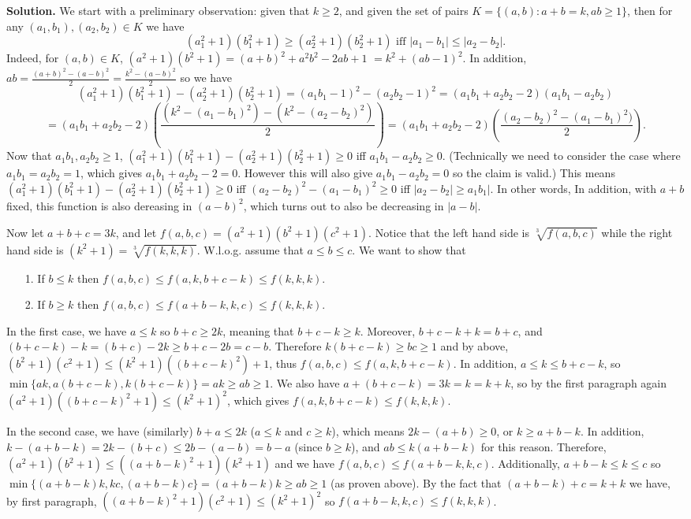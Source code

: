 \documentclass[11pt,a4paper]{article}
\begin{document}
\begin{itemize}
\textbf{Solution.} 
We start with a preliminary observation: 
given that $k\ge 2$, and given the set of pairs $K=\{(a,b): a+b=k, ab\ge 1\}$, 
then for any $(a_1,b_1), (a_2, b_2)\in K$ we have
\[(a_1^2+1)(b_1^2+1)\ge (a_2^2+1)(b_2^2+1) \text{ iff } |a_1-b_1|\le |a_2-b_2|.\] 
Indeed, for $(a,b)\in K$, $(a^2+1)(b^2+1)=(a+b)^2+a^2b^2-2ab+1$
$=k^2+(ab-1)^2$. 
In addition, $ab=\frac{(a+b)^2-(a-b)^2}{2}=\frac{k^2-(a-b)^2}{2}$
so we have 
\[(a_1^2+1)(b_1^2+1)-(a_2^2+1)(b_2^2+1)
=(a_1b_1-1)^2-(a_2b_2-1)^2
=(a_1b_1+a_2b_2-2)(a_1b_1-a_2b_2)\]
\[=(a_1b_1+a_2b_2-2)\left(\frac{(k^2-(a_1-b_1)^2)-(k^2-(a_2-b_2)^2)}{2}\right)
=(a_1b_1+a_2b_2-2)\left(\frac{(a_2-b_2)^2-(a_1-b_1)^2)}{2}\right).\]
Now that $a_1b_1, a_2b_2\ge 1$, 
$(a_1^2+1)(b_1^2+1)-(a_2^2+1)(b_2^2+1)\ge 0$ iff 
$a_1b_1-a_2b_2\ge 0$. 
(Technically we need to consider the case where $a_1b_1=a_2b_2=1$, which gives $a_1b_1+a_2b_2-2=0$. 
However this will also give $a_1b_1-a_2b_2=0$ so the claim is valid.)
This means $(a_1^2+1)(b_1^2+1)-(a_2^2+1)(b_2^2+1)\ge 0$ iff $(a_2-b_2)^2-(a_1-b_1)^2\ge 0$ 
iff $|a_2-b_2|\ge a_1b_1|$. 
In other words, 
In addition, with $a+b$ fixed, this function is also dereasing in $(a-b)^2$, which turns out to also be decreasing in $|a-b|$. 

Now let $a+b+c=3k$, and let $f(a,b,c)=(a^2+1)(b^2+1)(c^2+1)$. 
Notice that the left hand side is $\sqrt[3]{f(a,b,c)}$ while the right hand side is $(k^2+1)=\sqrt[3]{f(k,k,k)}$. 
W.l.o.g. assume that $a\le b\le c$. We want to show that 
\begin{itemize}
\item [1.] If $b\le k$ then $f(a,b,c)\le f(a, k, b+c-k)\le f(k, k, k)$. 
\item [2.] If $b\ge k$ then $f(a,b,c)\le f(a+b-k, k, c)\le f(k,k,k)$. 
\end{itemize}

In the first case, we have $a\le k$ so $b+c\ge 2k$, meaning that 
$b+c-k\ge k$. 
Moreover, $b+c-k+k=b+c$, and $(b+c-k)-k=(b+c)-2k\ge b+c-2b=c-b$. 
Therefore $k(b+c-k)\ge bc\ge 1$ and by above, $(b^2+1)(c^2+1)\le (k^2+1)((b+c-k)^2)+1$, thus 
$f(a,b,c)\le f(a, k, b+c-k)$. 
In addition, $a\le k\le b+c-k$, so $\min\{ak, a(b+c-k), k(b+c-k)\}=ak\ge ab\ge 1$. 
We also have $a+(b+c-k)=3k=k=k+k$, 
so by the first paragraph again 
$(a^2+1)((b+c-k)^2+1)\le (k^2+1)^2$, 
which gives 
$f(a, k, b+c-k)\le f(k, k, k)$. 

In the second case, we have (similarly)
$b+a\le 2k$ ($a\le k$ and $c\ge k$), which means $2k-(a+b)\ge 0$, or $k\ge a+b-k$. In addition, 
$k-(a+b-k)=2k-(b+c)\le 2b-(a-b)=b-a$ (since $b\ge k$), 
and 
$ab\le k(a+b-k)$ for this reason. 
Therefore, 
$(a^2+1)(b^2+1)\le ((a+b-k)^2+1)(k^2+1)$ 
and we have $f(a,b,c)\le f(a+b-k, k, c)$. 
Additionally, $a+b-k\le k\le c$ so
$\min\{(a+b-k)k, kc, (a+b-k)c\}=(a+b-k)k\ge ab\ge 1$ (as proven above). 
By the fact that $(a+b-k)+c=k+k$ we have, by first paragraph, 
$((a+b-k)^2+1)(c^2+1)\le (k^2+1)^2$ so 
$f(a+b-k, k, c)\le f(k,k,k)$. 


\end{itemize}
\end{document}
